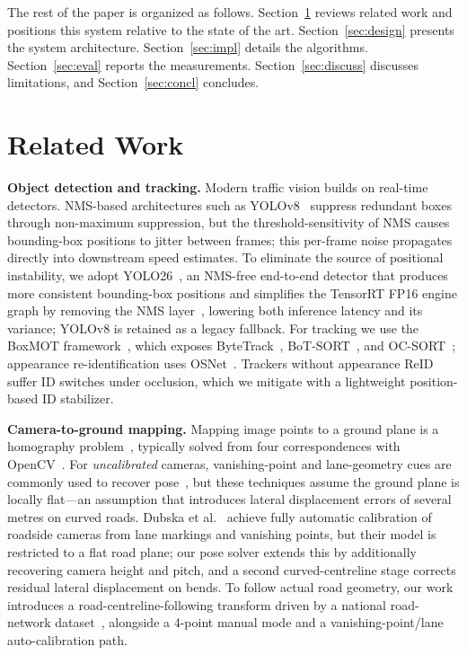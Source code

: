 \documentclass[conference]{IEEEtran}
\renewcommand{\_}{\textunderscore\allowbreak}
\begin{document}
The rest of the paper is organized as follows. Section~\ref{sec:related} reviews
related work and positions this system relative to the state of the art.
Section~\ref{sec:design} presents the system architecture.
Section~\ref{sec:impl} details the algorithms. Section~\ref{sec:eval} reports the
measurements. Section~\ref{sec:discuss} discusses limitations, and
Section~\ref{sec:concl} concludes.

\section{Related Work}\label{sec:related}
\textbf{Object detection and tracking.} Modern traffic vision builds on real-time
detectors. NMS-based architectures such as YOLOv8~\cite{yolov8} suppress redundant
boxes through non-maximum suppression, but the threshold-sensitivity of NMS causes
bounding-box positions to jitter between frames; this per-frame noise propagates
directly into downstream speed estimates. To eliminate the source of positional
instability, we adopt YOLO26~\cite{yolo26}, an NMS-free end-to-end detector that
produces more consistent bounding-box positions and simplifies the TensorRT FP16
engine graph by removing the NMS layer~\cite{tensorrt}, lowering both inference
latency and its variance; YOLOv8 is retained as a legacy fallback. For tracking we use the BoxMOT
framework~\cite{boxmot}, which exposes ByteTrack~\cite{bytetrack},
BoT-SORT~\cite{botsort}, and OC-SORT~\cite{ocsort}; appearance re-identification
uses OSNet~\cite{osnet}. Trackers without appearance ReID suffer ID switches under
occlusion, which we mitigate with a lightweight position-based ID stabilizer.

\textbf{Camera-to-ground mapping.} Mapping image points to a ground plane is a
homography problem~\cite{hartley2004}, typically solved from four correspondences
with OpenCV~\cite{opencv}. For \emph{uncalibrated} cameras, vanishing-point and
lane-geometry cues are commonly used to recover pose~\cite{dubska2014}, but these techniques assume
the ground plane is locally flat---an assumption that introduces lateral
displacement errors of several metres on curved roads.
Dubska et al.~\cite{dubska2014} achieve fully automatic calibration of roadside
cameras from lane markings and vanishing points, but their model is restricted to
a flat road plane; our pose solver extends this by additionally recovering camera
height and pitch, and a second curved-centreline stage corrects residual lateral
displacement on bends. To follow actual road
geometry, our work introduces a road-centreline-following transform driven by a
national road-network dataset~\cite{moct_nodelink}, alongside a 4-point manual
mode and a vanishing-point/lane auto-calibration path.
\end{document}
